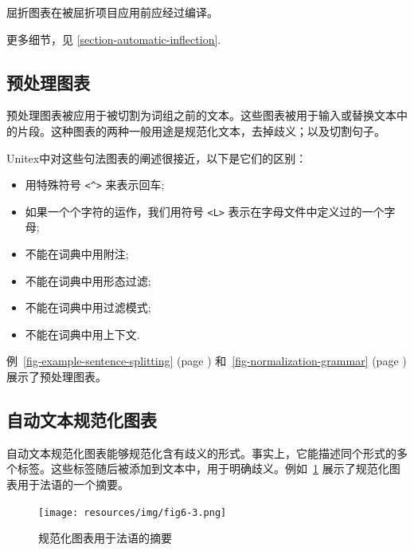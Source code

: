 \bigskip
\noindent 屈折图表在被屈折项目应用前应经过编译。


\bigskip
\noindent 更多细节，见
\ref{section-automatic-inflection}.

\subsection{预处理图表}
预处理图表被应用于被切割为词组之前的文本。这些图表被用于输入或替换文本中的片段。这种图表的两种一般用途是规范化文本，去掉歧义；以及切割句子。


\bigskip
\noindent Unitex中对这些句法图表的阐述很接近，以下是它们的区别：
\begin{itemize}
  \item 用特殊符号 \verb+<^>+ 来表示回车;\index{\verb+<^>+}
  \item 如果一个个字符的运作，我们用符号 \verb+<L>+ 表示在字母文件中定义过的一个字母;
  \item 不能在词典中用附注;
  \item 不能在词典中用形态过滤;
  \item 不能在词典中用过滤模式;
  \item 不能在词典中用上下文.
\end{itemize}

例~\ref{fig-example-sentence-splitting} (page \pageref{fig-example-sentence-splitting})
和~\ref{fig-normalization-grammar} (page \pageref{fig-normalization-grammar}) 展示了预处理图表。


\subsection{自动文本规范化图表}
\label{section-normalizing-text-automataon}
自动文本规范化图表能够规范化含有歧义的形式。事实上，它能描述同个形式的多个标签。这些标签随后被添加到文本中，用于明确歧义。例如~\ref{fig-tfst-normalization-grammar} 展示了规范化图表用于法语的一个摘要。

\bigskip
\begin{figure}[!h]
\begin{center}
\texttt{[image: resources/img/fig6-3.png]}
\caption{规范化图表用于法语的摘要\label{fig-tfst-normalization-grammar}}
\end{center}
\end{figure}

